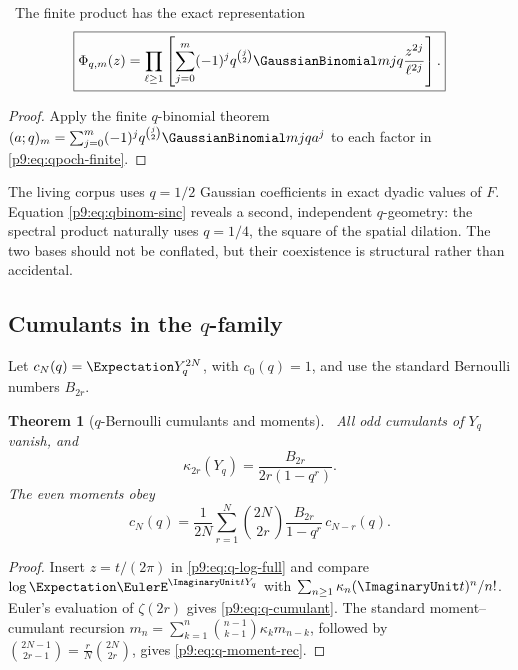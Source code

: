 \documentclass[11pt]{article}
\numberwithin{equation}{section}
\newtheorem{theorem}{Theorem}[section]
\theoremstyle{definition}
\theoremstyle{remark}
\begin{document}
\begin{corollary}\label{p9:cor:qbinom-finite}
\statusN\ The finite product has the exact representation
\begin{equation}
 \boxed{
 \Phi_{q,m}(z)=\prod_{\ell\ge1}
 \left[
  \sum_{j=0}^{m}(-1)^jq^{\binom j2}\GaussianBinomial mjq\frac{z^{2j}}{\ell^{2j}}
 \right].}                                                  \label{p9:eq:qbinom-sinc}
\end{equation}
\end{corollary}

\begin{proof}
Apply the finite $q$-binomial theorem
$(a;q)_m=\sum_{j=0}^m(-1)^jq^{\binom j2}\GaussianBinomial mjq a^j$
to each factor in \eqref{p9:eq:qpoch-finite}.
\end{proof}

\begin{remark}
The living corpus uses $q=1/2$ Gaussian coefficients in exact dyadic values of $F$.
Equation \eqref{p9:eq:qbinom-sinc} reveals a second, independent $q$-geometry: the spectral
product naturally uses $q=1/4$, the square of the spatial dilation.  The two bases should
not be conflated, but their coexistence is structural rather than accidental.
\end{remark}

\subsection{Cumulants in the $q$-family}
Let $c_N(q)=\Expectation Y_q^{2N}$, with $c_0(q)=1$, and use the standard Bernoulli numbers
$B_{2r}$.

\begin{theorem}[$q$-Bernoulli cumulants and moments]\label{p9:thm:q-cumulants}
\statusN\ All odd cumulants of $Y_q$ vanish, and
\begin{equation}
 \boxed{\kappa_{2r}(Y_q)=\frac{B_{2r}}{2r(1-q^r)}.}         \label{p9:eq:q-cumulant}
\end{equation}
The even moments obey
\begin{equation}
 \boxed{
 c_N(q)=\frac1{2N}\sum_{r=1}^{N}
 \binom{2N}{2r}\frac{B_{2r}}{1-q^r}\,c_{N-r}(q).}         \label{p9:eq:q-moment-rec}
\end{equation}
\end{theorem}

\begin{proof}
Insert $z=t/(2\pi)$ in \eqref{p9:eq:q-log-full} and compare
$\log\Expectation\EulerE^{\ImaginaryUnit tY_q}$ with
$\sum_{n\ge1}\kappa_n(\ImaginaryUnit t)^n/n!$.  Euler's evaluation of $\zeta(2r)$ gives
\eqref{p9:eq:q-cumulant}.  The standard moment--cumulant recursion
$m_n=\sum_{k=1}^n\binom{n-1}{k-1}\kappa_km_{n-k}$, followed by
$\binom{2N-1}{2r-1}=\frac rN\binom{2N}{2r}$, gives
\eqref{p9:eq:q-moment-rec}.
\end{proof}
\end{document}
